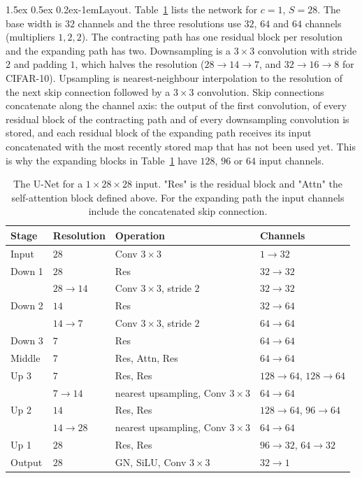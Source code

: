 \documentclass{article}
\makeatletter
\renewcommand{\normalsize}{\fontsize{10pt}{11pt}\selectfont}
\renewcommand{\paragraph}{\@startsection{paragraph}{4}{\z@}%
  {1.5ex \@plus 0.5ex \@minus 0.2ex}{-1em}{\normalsize\bfseries}}
\theoremstyle{remark}
\makeatother
\begin{document}
\paragraph{Layout.} Table~\ref{tab:unet} lists the network for $c = 1$, $S = 28$. The base width is $32$ channels and the three resolutions use $32$, $64$ and $64$ channels (multipliers $1,2,2$). The contracting path has one residual block per resolution and the expanding path has two. Downsampling is a $3 \times 3$ convolution with stride $2$ and padding $1$, which halves the resolution ($28 \to 14 \to 7$, and $32 \to 16 \to 8$ for CIFAR-10). Upsampling is nearest-neighbour interpolation to the resolution of the next skip connection followed by a $3 \times 3$ convolution. Skip connections concatenate along the channel axis: the output of the first convolution, of every residual block of the contracting path and of every downsampling convolution is stored, and each residual block of the expanding path receives its input concatenated with the most recently stored map that has not been used yet. This is why the expanding blocks in Table~\ref{tab:unet} have $128$, $96$ or $64$ input channels.

\begin{table}[h]
\caption{The U-Net for a $1 \times 28 \times 28$ input. "Res" is the residual block and "Attn" the self-attention block defined above. For the expanding path the input channels include the concatenated skip connection.}\label{tab:unet}
\centering
\begin{tabular}{llll}
\toprule
Stage & Resolution & Operation & Channels\\
\midrule
Input & $28$ & Conv $3 \times 3$ & $1 \to 32$\\
Down 1 & $28$ & Res & $32 \to 32$\\
 & $28 \to 14$ & Conv $3 \times 3$, stride $2$ & $32 \to 32$\\
Down 2 & $14$ & Res & $32 \to 64$\\
 & $14 \to 7$ & Conv $3 \times 3$, stride $2$ & $64 \to 64$\\
Down 3 & $7$ & Res & $64 \to 64$\\
Middle & $7$ & Res, Attn, Res & $64 \to 64$\\
Up 3 & $7$ & Res, Res & $128 \to 64$, $128 \to 64$\\
 & $7 \to 14$ & nearest upsampling, Conv $3 \times 3$ & $64 \to 64$\\
Up 2 & $14$ & Res, Res & $128 \to 64$, $96 \to 64$\\
 & $14 \to 28$ & nearest upsampling, Conv $3 \times 3$ & $64 \to 64$\\
Up 1 & $28$ & Res, Res & $96 \to 32$, $64 \to 32$\\
Output & $28$ & GN, SiLU, Conv $3 \times 3$ & $32 \to 1$\\
\bottomrule
\end{tabular}
\end{table}
\end{document}
